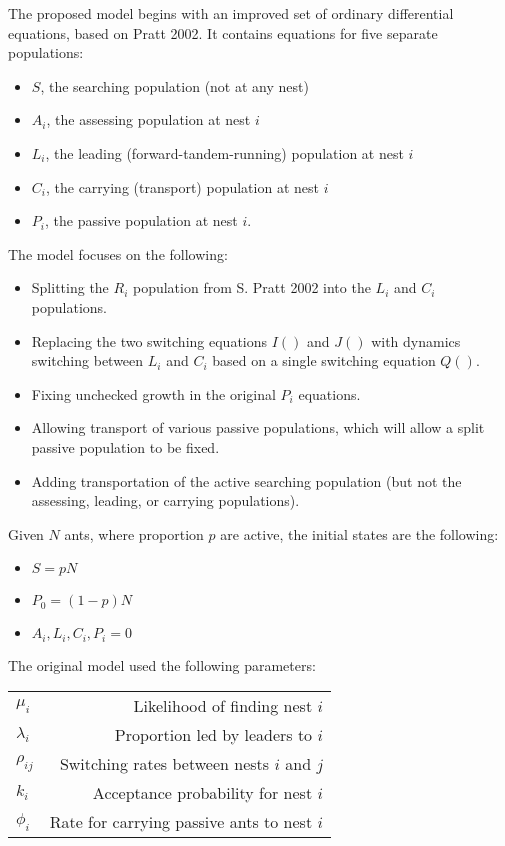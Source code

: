 \documentclass{article}
\begin{document}
  The proposed model begins with an improved set of ordinary differential equations, based on Pratt 2002.
  It contains equations for five separate populations: 
  \begin{itemize}
      \item $S$, the searching population (not at any nest)
      \item $A_i$, the assessing population at nest $i$
      \item $L_i$, the leading (forward-tandem-running) population at nest $i$
      \item $C_i$, the carrying (transport) population at nest $i$
      \item $P_i$, the passive population at nest $i$. 
  \end{itemize}
  The model focuses on the following:
  \begin{itemize}
      \item Splitting the $R_i$ population from S. Pratt 2002 into the $L_i$ and $C_i$ populations.
      \item Replacing the two switching equations $I()$ and $J()$ with dynamics switching between $L_i$ and $C_i$ based on a single switching equation $Q()$.
      \item Fixing unchecked growth in the original $P_i$ equations.
      \item Allowing transport of various passive populations, which will allow a split passive population to be fixed.
      \item Adding transportation of the active searching population (but not the assessing, leading, or carrying populations).
  \end{itemize}

  Given $N$ ants, where proportion $p$ are active, the initial states are the following:
  \begin{itemize}
      \item $S = pN$
      \item $P_0 = (1-p)N$ 
      \item $A_i, L_i, C_i, P_i = 0$ 
  \end{itemize}

  The original model used the following parameters:\\

\begin{tabular}{ l | r }
    \hline
  $\mu_i$     & Likelihood of finding nest $i$\\
  $\lambda_i$ & Proportion led by leaders to $i$\\
  $\rho_{ij}$ & Switching rates between nests $i$ and $j$\\
  $k_i$       & Acceptance probability for nest $i$\\
  $\phi_i$    & Rate for carrying passive ants to nest $i$\\
    \hline
\end{tabular} \\
\end{document}
